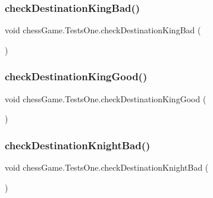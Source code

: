 \hypertarget{classchess_game_1_1_tests_one_aa2659eaaf952de90d827cb12b0e7c0e2}{}\label{classchess_game_1_1_tests_one_aa2659eaaf952de90d827cb12b0e7c0e2} 
\subsubsection{\texorpdfstring{check\+Destination\+King\+Bad()}{checkDestinationKingBad()}}
{\footnotesize\ttfamily void chess\+Game.\+Tests\+One.\+check\+Destination\+King\+Bad (\begin{DoxyParamCaption}{ }\end{DoxyParamCaption})}

\hypertarget{classchess_game_1_1_tests_one_a256844b22f9f1d9137a49a72d1847fce}{}\label{classchess_game_1_1_tests_one_a256844b22f9f1d9137a49a72d1847fce} 
\subsubsection{\texorpdfstring{check\+Destination\+King\+Good()}{checkDestinationKingGood()}}
{\footnotesize\ttfamily void chess\+Game.\+Tests\+One.\+check\+Destination\+King\+Good (\begin{DoxyParamCaption}{ }\end{DoxyParamCaption})}

\hypertarget{classchess_game_1_1_tests_one_abad959a4f06760f812cf016ea0f1c756}{}\label{classchess_game_1_1_tests_one_abad959a4f06760f812cf016ea0f1c756} 
\subsubsection{\texorpdfstring{check\+Destination\+Knight\+Bad()}{checkDestinationKnightBad()}}
{\footnotesize\ttfamily void chess\+Game.\+Tests\+One.\+check\+Destination\+Knight\+Bad (\begin{DoxyParamCaption}{ }\end{DoxyParamCaption})}

